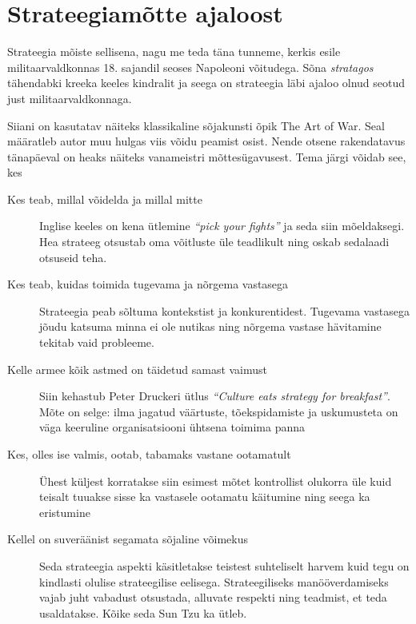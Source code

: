 \documentclass{tufte-book}
\begin{document}
\section{Strateegiamõtte ajaloost}
Strateegia mõiste sellisena, nagu me teda täna tunneme, kerkis esile militaarvaldkonnas 18. sajandil seoses Napoleoni võitudega. Sõna \emph{stratagos} tähendabki kreeka keeles kindralit ja seega on strateegia läbi ajaloo olnud seotud just militaarvaldkonnaga.

Siiani on kasutatav näiteks klassikaline sõjakunsti õpik The Art of War\cite{tzu2013art}. Seal määratleb autor muu hulgas viis võidu peamist osist. Nende otsene rakendatavus tänapäeval on heaks näiteks vanameistri mõttesügavusest. Tema järgi võidab see, kes

\begin{description}
	\item[Kes teab, millal võidelda ja millal mitte] Inglise keeles on kena ütlemine \emph{\enquote{pick your fights}} ja seda siin mõeldaksegi. Hea strateeg otsustab oma võitluste üle teadlikult ning oskab sedalaadi otsuseid teha.
	\item[Kes teab, kuidas toimida tugevama ja nõrgema vastasega] Strateegia peab sõltuma kontekstist ja konkurentidest. Tugevama vastasega jõudu katsuma minna ei ole nutikas ning nõrgema vastase hävitamine tekitab vaid probleeme.
	\item[Kelle armee kõik astmed on täidetud samast vaimust] Siin kehastub Peter Druckeri ütlus \emph{\enquote{Culture eats strategy for breakfast}}. Mõte on selge: ilma jagatud väärtuste, tõekspidamiste ja uskumusteta on väga keeruline organisatsiooni ühtsena toimima panna
	\item[Kes, olles ise valmis, ootab, tabamaks vastane ootamatult] Ühest küljest korratakse siin esimest mõtet kontrollist olukorra üle kuid teisalt tuuakse sisse ka vastasele ootamatu käitumine ning seega ka eristumine
	\item[Kellel on suveräänist segamata sõjaline võimekus] Seda strateegia aspekti käsitletakse teistest suhteliselt harvem kuid tegu on kindlasti olulise strateegilise eelisega. Strateegiliseks manööverdamiseks vajab juht vabadust otsustada, alluvate respekti ning teadmist, et teda usaldatakse. Kõike seda Sun Tzu ka ütleb. 
\end{description}
\end{document}
